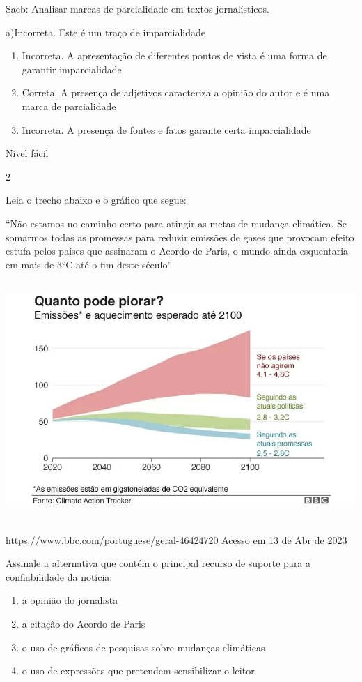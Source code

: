 {Saeb: Analisar marcas de parcialidade em textos jornalísticos.

a)Incorreta. Este é um traço de imparcialidade

\begin{enumerate}
\def\labelenumi{\arabic{enumi}.}
\item
  Incorreta. A apresentação de diferentes pontos de vista é uma forma de
  garantir imparcialidade
\item
  Correta. A presença de adjetivos caracteriza a opinião do autor e é
  uma marca de parcialidade
\item
  Incorreta. A presença de fontes e fatos garante certa imparcialidade
\end{enumerate}

Nível fácil

\num{2}

Leia o trecho abaixo e o gráfico que segue:

``Não estamos no caminho certo para atingir as metas de mudança
climática. Se somarmos todas as promessas para reduzir emissões de gases
que provocam efeito estufa pelos países que assinaram o Acordo de Paris,
o mundo ainda esquentaria em mais de 3°C até o fim deste século''

\includegraphics[width=5.90551in,height=3.56944in]{./imgSAEB_7_POR/media/image8.png}

\href{https://www.bbc.com/portuguese/geral-46424720}{\uline{https://www.bbc.com/portuguese/geral-46424720}}
Acesso em 13 de Abr de 2023

Assinale a alternativa que contém o principal recurso de suporte para a
confiabilidade da notícia:

\begin{enumerate}
\def\labelenumi{\alph{enumi})}
\item
  a opinião do jornalista
\item
  a citação do Acordo de Paris
\item
  o uso de gráficos de pesquisas sobre mudanças climáticas
\item
  o uso de expressões que pretendem sensibilizar o leitor
\end{enumerate}

}
